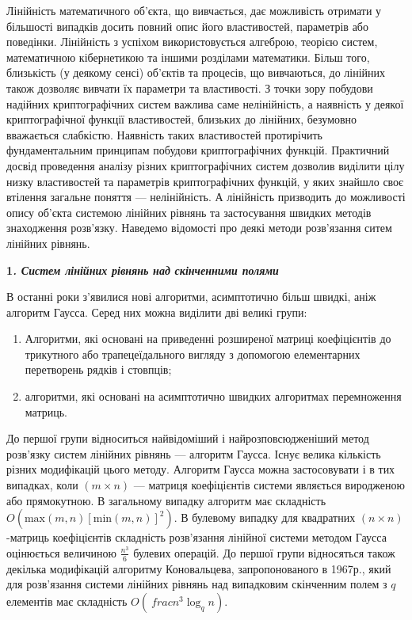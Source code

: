 \bigskip


\bigskip

Лінійність математичного об’єкта, що вивчається, дає можливість отримати у
більшості випадків досить повний опис його властивостей, параметрів або
поведінки. Лінійність з успіхом використовується алгеброю, теорією систем,
математичною кібернетикою та іншими розділами математики. Більш того,
близькість (у деякому сенсі)  об’єктів та процесів, що вивчаються, до лінійних
також дозволяє вивчати їх параметри та властивості. З точки зору побудови
надійних криптографічних систем важлива саме нелінійність, а наявність у деякої
криптографічної функції властивостей, близьких до лінійних, безумовно
вважається слабкістю. Наявність таких властивостей протирічить фундаментальним
принципам побудови криптографічних функцій. Практичний досвід проведення
аналізу різних криптографічних систем дозволив виділити цілу низку властивостей
та параметрів криптографічних функцій, у яких знайшло своє втілення загальне
поняття --- нелінійність. А лінійність призводить до можливості опису об’єкта
системою лінійних рівнянь та застосування швидких методів знаходження
розв’язку. Наведемо відомості про деякі методи розв’язання ситем лінійних
рівнянь.


\bigskip

{\bfseries
1\textit{. Систем лінійних рівнянь над скінченними полями}}

 В останні роки з’явилися нові алгоритми, асимптотично більш швидкі, аніж
алгоритм Гаусса. Серед них можна виділити дві великі групи:

\liststyleWWviiiNumxxiii
\begin{enumerate}
\item Алгоритми, які основані на приведенні розширеної матриці коефіцієнтів до
трикутного або трапецеїдального вигляду з допомогою елементарних перетворень
рядків і стовпців;
\item алгоритми, які основані на асимптотично швидких алгоритмах перемноження
матриць.
\end{enumerate}
До першої групи відноситься найвідоміший і найрозповсюдженіший метод розв’язку
систем лінійних рівнянь --- алгоритм Гаусса. Існує велика кількість різних
модифікацій цього методу. Алгоритм Гаусса можна застосовувати і в тих випадках,
коли  $(m\times n)$ --- матриця коефіцієнтів системи являється виродженою або
прямокутною. В загальному випадку алгоритм має складність 
$O(\text{max}(m,n)[\text{min}(m,n)]^2)$. В булевому випадку для
квадратних  $(n\times n)${}-матриць коефіцієнтів складність розв’язання
лінійної системи методом Гаусса оцінюється величиною  $\frac{n^{3}}6$
булевих операцій. До першої групи відносяться також декілька модифікацій
алгоритму Коновальцева, запропонованого в 1967р., який для розв’язання системи
лінійних рівнянь над випадковим скінченним полем з  $q$ елементів має
складність  $O\left(\ frac{n^{3}}{\log _qn} \right)$.

